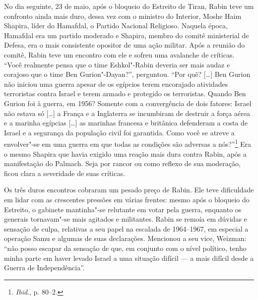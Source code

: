 No dia seguinte, 23 de maio, após o bloqueio do Estreito de Tiran, Rabin teve
um confronto ainda mais duro, dessa vez com o ministro do Interior,
Moshe Haim Shapira, líder do Hamafdal, o Partido Nacional Religioso.
Naquela época, Hamafdal era um partido
moderado e Shapira, membro do comitê ministerial de Defesa, era o mais
consistente opositor de uma ação militar. Após a reunião do comitê, Rabin
teve um encontro com ele e sofreu uma avalanche de críticas. ``Você
realmente pensa que o time Eshkol"-Rabin deveria ser mais audaz e
corajoso que o time Ben Gurion"-Dayan?'', perguntou. ``Por quê? {[}\ldots{}{]} Ben
Gurion não iniciou uma guerra apesar de os egípcios terem encorajado
atividades terroristas contra Israel e terem armado e protegido os
terroristas. Quando Ben Gurion foi à guerra, em 1956? Somente com a
convergência de dois fatores: Israel não estava só {[}\ldots{}{]} a França e a
Inglaterra se incumbiram de destruir a força aérea e a marinha
egípcias {[}\ldots{}{]} as marinhas francesa e britânica defenderam a costa de Israel
e a segurança da população civil foi garantida. Como você se atreve a
envolver"-se em uma guerra em que todas as condições são adversas a
nós?''\footnote{\textit{Ibid}., p. 80--2.} Era o mesmo Shapira que havia exigido uma reação mais
dura contra Rabin, após a manifestação do Palmach. Seja por rancor ou
como reflexo de sua moderação, ficou clara a severidade de suas
críticas.

Os três duros encontros cobraram um pesado preço de Rabin. Ele teve
dificuldade em lidar com as crescentes pressões em várias frentes: mesmo
após o bloqueio do Estreito, o gabinete mantinha"-se relutante em votar
pela guerra, enquanto os generais tornavam"-se mais agitados e
militantes. Rabin se remoía em dúvidas e sensação de culpa,
relativas a seu papel na escalada de 1964--1967, em especial a operação
Samu e algumas de suas declarações. Mencionou a seu vice,
Weizman: ``não posso escapar da sensação de que, em conjunto com o nível
político, tenho minha parte em haver levado Israel a uma situação
difícil --- a mais difícil desde a Guerra de Independência''.

